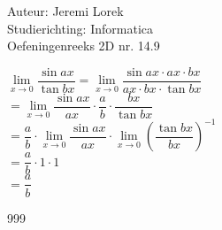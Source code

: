\documentclass[a4paper]{article}
\begin{document}
  
\noindent \large Auteur: Jeremi Lorek\\
\noindent \large Studierichting: Informatica\\
\noindent \large Oefeningenreeks 2D nr. 14.9\\

\medskip
\normalsize

$\lim\limits_{x \to 0} \dfrac{\sin a x}{\tan b x} = \lim\limits_{x \to 0} \dfrac{\sin a x \cdot a x \cdot b x}{a x \cdot b x \cdot \tan b x}$  \\

$= \lim\limits_{x \to 0} \dfrac{\sin a x}{a x} \cdot \dfrac{a}{b} \cdot \dfrac{b x}{\tan b x}$  \\

$= \dfrac{a}{b} \cdot \lim\limits_{x \to 0} \dfrac{\sin a x}{a x} \cdot \lim\limits_{x \to 0} \left( \dfrac{\tan b x}{b x} \right)^{-1}$  \\

$= \dfrac{a}{b} \cdot 1 \cdot 1 $ \\

$= \dfrac{a}{b}$  \\


\begin{thebibliography}{999}
\end{thebibliography}
\end{document}
